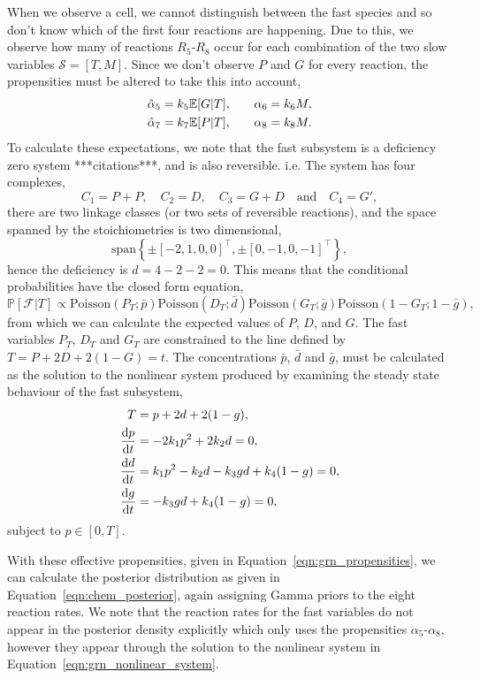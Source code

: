 \documentclass[final]{siamltex}
\begin{document}
When we observe a cell, we cannot distinguish between the fast species and so don't know which of the first four reactions are happening. Due to this, we observe how many of reactions $R_5$-$R_8$ occur for each combination of the two slow variables $\mathcal{S} = [T, M]$. Since we don't observe $P$ and $G$ for every reaction, the propensities must be altered to take this into account,
\begin{align}
	\hat{\alpha}_5 = k_5\mathbb{E}[G|T],\quad&\quad \alpha_6 = k_6M, \notag\\
	\hat{\alpha}_7 = k_7\mathbb{E}[P|T], \quad&\quad \alpha_8 = k_8M.\label{eqn:grn_propensities}
\end{align}
To calculate these expectations, we note that the fast subsystem is a deficiency zero system ***citations***, and is also reversible. i.e. The system has four complexes, 
\[
	C_1 = P+P, \quad C_2 = D, \quad C_3 = G+D \quad \text{and} \quad  C_4 = G',
\]
there are two linkage classes (or two sets of reversible reactions), and the space spanned by the stoichiometries is two dimensional,
\[
	\text{span}\left\{\pm[-2, 1, 0, 0]^\top, \pm[0, -1, 0, -1]^\top\right\},
\]
hence the deficiency is $d = 4 - 2 - 2 = 0$. This means that the conditional probabilities have the closed form equation,
\[
	\mathbb{P}[\mathcal{F}|T] \propto \text{Poisson}(P_T;\bar{p})\text{Poisson}(D_T;\bar{d})\text{Poisson}(G_T;\bar{g})\text{Poisson}(1-G_T;1-\bar{g}),
\]
from which we can calculate the expected values of $P$, $D$, and $G$. The fast variables $P_T$, $D_T$ and $G_T$ are constrained to the line defined by $T=P+2D+2(1-G)=t$. The concentrations $\bar{p}$, $\bar{d}$ and $\bar{g}$, must be calculated as the solution to the nonlinear system produced by examining the steady state behaviour of the fast subsystem,
\begin{align}
	T &= p + 2d + 2(1-g), \notag\\
	\frac{\text{d}p}{\text{d}t} &= -2k_1p^2+2k_2d = 0, \notag\\
	\frac{\text{d}d}{\text{d}t} &= k_1p^2 - k_2d - k_3gd + k_4(1-g) = 0, \notag\\
	\frac{\text{d}g}{\text{d}t} &= -k_3gd + k_4(1-g) = 0, \label{eqn:grn_nonlinear_system}
\end{align}
subject to $p \in [0, T]$.

With these effective propensities, given in Equation~\eqref{eqn:grn_propensities}, we can calculate the posterior distribution as given in Equation~\eqref{eqn:chem_posterior}, again assigning Gamma priors to the eight reaction rates. We note that the reaction rates for the fast variables do not appear in the posterior density explicitly which only uses the propensities $\alpha_5$-$\alpha_8$, however they appear through the solution to the nonlinear system in Equation~\eqref{eqn:grn_nonlinear_system}.
\end{document}
